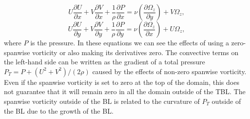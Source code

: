 \begin{equation}\label{eq:RANS_x_BC_OMEGA}
    U \frac {\partial U} {\partial x} + V \frac {\partial V} {\partial x} +
      \frac {1} {\rho} \frac {\partial P} {\partial x} = 
      \nu \left( \frac {\partial \Omega_z} {\partial y} \right) + V \Omega_z,
\end{equation}
\begin{equation}\label{eq:RANS_Y_BC_OMEGA}
    U \frac {\partial U} {\partial y} + V \frac {\partial V} {\partial y} +
      \frac {1} {\rho} \frac {\partial P} {\partial y} = 
      \nu \left( \frac {\partial \Omega_z} {\partial x} \right) + U \Omega_z,
\end{equation}
where $P$ is the pressure. In these equations we can see the effects of using a zero-spanwise vorticity or also making its derivatives zero. The convective terms on the left-hand side can be written as the gradient of a total pressure $P_T = P + (U^2+V^2)/(2\rho)$ caused by the effects of non-zero spanwise vorticity. Even if the spanwise vorticity is set to zero at the top of the domain, this does not guarantee that it will remain zero in all the domain outside of the TBL.
The spanwise vorticity outside of the BL is related to the curvature of $P_T$ outside of the BL due to the growth of the BL.
